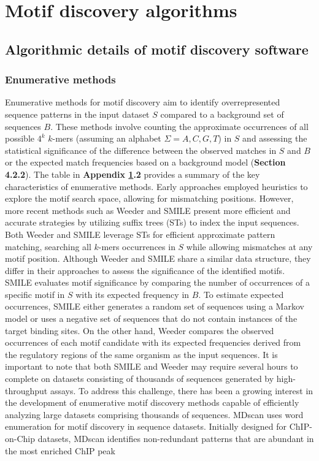 \documentclass[a4paper, titlepage, openright]{book}
\begin{document}
\chapter{Motif discovery algorithms}\label{appendix:motifdiscovery}

\section{Algorithmic details of motif discovery software}

\subsection{Enumerative methods}
Enumerative methods for motif discovery aim to identify overrepresented sequence patterns in the input dataset $S$ compared to a background set of sequences $B$. These methods involve counting the approximate occurrences of all possible $4^{k}$ $k$-mers (assuming an alphabet $\Sigma={A,C,G,T}$) in $S$ and assessing the statistical significance of the difference between the observed matches in $S$ and $B$ or the expected match frequencies based on a background model (\textbf{Section 4.2.2}). The table in \textbf{Appendix \ref{appendix:motifdiscovery}.2} provides a summary of the key characteristics of enumerative methods. Early approaches employed heuristics to explore the motif search space, allowing for mismatching positions. However, more recent methods such as Weeder \citep{pavesi2001algorithm,pavesi2004weeder} and SMILE \citep{marsan2000algorithms} present more efficient and accurate strategies by utilizing suffix trees (STs) to index the input sequences. Both Weeder and SMILE leverage STs for efficient approximate pattern matching, searching all $k$-mers occurrences in $S$ while allowing mismatches at any motif position. Although Weeder and SMILE share a similar data structure, they differ in their approaches to assess the significance of the identified motifs. SMILE evaluates motif significance by comparing the number of occurrences of a specific motif in $S$ with its expected frequency in $B$. To estimate expected occurrences, SMILE either generates a random set of sequences using a Markov model or uses a negative set of sequences that do not contain instances of the target binding sites. On the other hand, Weeder compares the observed occurrences of each motif candidate with its expected frequencies derived from the regulatory regions of the same organism as the input sequences. It is important to note that both SMILE and Weeder may require several hours to complete on datasets consisting of thousands of sequences generated by high-throughput assays. To address this challenge, there has been a growing interest in the development of enumerative motif discovery methods capable of efficiently analyzing large datasets comprising thousands of sequences. MDscan \citep{liu2002algorithm} uses word enumeration for motif discovery in sequence datasets. Initially designed for ChIP-on-Chip datasets, MDscan identifies non-redundant patterns that are abundant in the most enriched ChIP peak 
\end{document}
